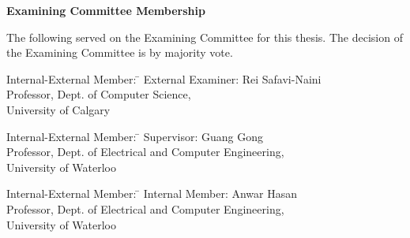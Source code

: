 \pagestyle{plain}
\setcounter{page}{2}

\cleardoublepage %
 
\begin{center}\textbf{Examining Committee Membership}\end{center}
  \noindent
The following served on the Examining Committee for this thesis. The decision of the Examining Committee is by majority vote.
  \bigskip
  
  \noindent
\begin{tabbing}
Internal-External Member: \=  \kill %
External Examiner: \>  Rei Safavi-Naini \\ 
\> Professor, Dept. of Computer Science,\\
\> University of Calgary \\
\end{tabbing} 
  \bigskip
  
  \noindent
\begin{tabbing}
Internal-External Member: \=  \kill %
Supervisor: \> Guang Gong \\
\> Professor, Dept. of Electrical and Computer Engineering,\\
\> University of Waterloo \\

\end{tabbing}
  \bigskip
  
  \noindent
  \begin{tabbing}
Internal-External Member: \=  \kill %
Internal Member: \> Anwar Hasan\\
\> Professor, Dept. of Electrical and Computer Engineering,\\
\> University of Waterloo \\
\end{tabbing}
  \bigskip

